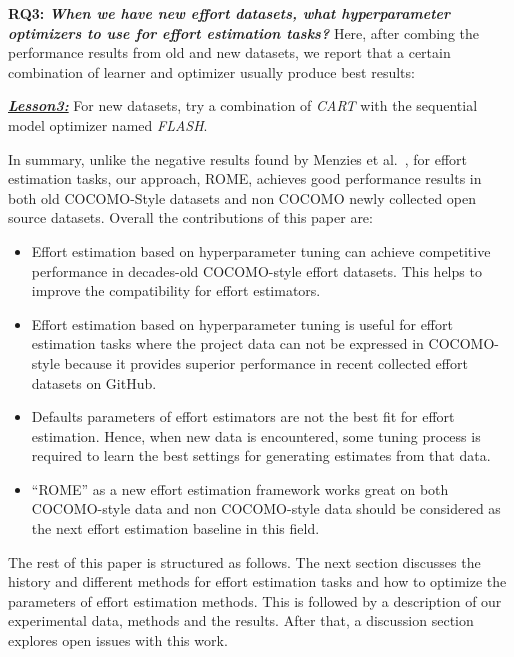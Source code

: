 \documentclass[sigconf,review]{acmart}
\newcommand{\bi}{\begin{itemize}}
\newcommand{\ei}{\end{itemize}}
\newenvironment{result}[2]
{\begin{myshadowbox}\textbf{\textit{\underline{Lesson#1:}}} #2}{ 
\end{myshadowbox}}
\begin{document}
{\bf RQ3: \em When we have new effort datasets, what hyperparameter optimizers to use for effort estimation tasks?} Here, after combing the performance results from old and new datasets, we report that a certain combination  of learner and optimizer usually
produce best results:
\begin{result}{3}
For new datasets, try a combination of {\em CART} with the sequential model optimizer named {\em FLASH}.
\end{result}


In summary, unlike the negative results found by Menzies et al.~\cite{MenziesNeg:2017}, for effort estimation tasks, our approach, ROME, achieves good performance results in both old COCOMO-Style datasets and non COCOMO newly collected open source datasets. Overall the contributions of this paper are:
\bi
\item Effort estimation based on hyperparameter tuning can achieve competitive performance in  decades-old COCOMO-style effort datasets. This helps to improve the compatibility for effort estimators. 

\item  Effort estimation based on hyperparameter tuning is useful for  effort estimation tasks where the project data can not be expressed in COCOMO-style because it provides superior performance in recent collected effort datasets on GitHub.

\item Defaults parameters of effort estimators are not the best fit for effort estimation. Hence, when new
data is encountered, some tuning process is required
to learn the best settings for generating estimates
from that data.

\item ``ROME'' as a new effort estimation framework works great on both COCOMO-style data and non COCOMO-style data should be considered as the next effort estimation baseline in this field.
\ei
The rest of this paper is structured as follows.
The next section discusses the history and different methods for effort estimation tasks and how to optimize
the parameters of effort estimation methods. This is followed by a description of our experimental data, methods and the results. After that, a discussion section explores open issues with this work. 
\end{document}
